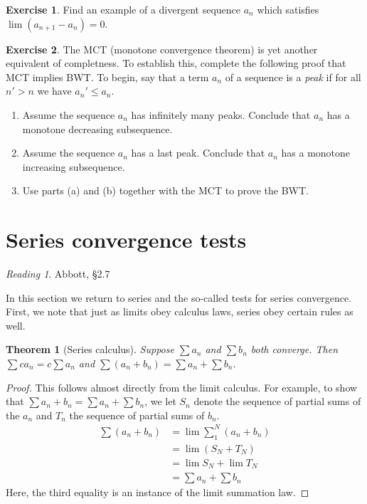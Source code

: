 \documentclass[11pt,oneside]{amsbook}
\theoremstyle{definition}
\newtheorem{exerc}{Exercise}[section]
\theoremstyle{plain}
\newtheorem{theorem}{Theorem}[section]
\theoremstyle{definition}
\theoremstyle{remark}
\newtheorem*{reading}{Reading}
\numberwithin{equation}{section}
\numberwithin{figure}{section}
\begin{document}
\begin{exerc}
  Find an example of a divergent sequence $a_n$ which satisfies $\lim(a_{n+1}-a_n)=0$.
\end{exerc}

\begin{exerc}
  The MCT (monotone convergence theorem) is yet another equivalent of completness. To establish this, complete the following proof that MCT implies BWT. To begin, say that a term $a_n$ of a sequence is a \emph{peak} if for all $n'>n$ we have $a_n'\leq a_n$.
  \begin{enumerate}
    \item Assume the sequence $a_n$ has infinitely many peaks. Conclude that $a_n$ has a monotone decreasing subsequence.
    \item Assume the sequence $a_n$ has a last peak. Conclude that $a_n$ has a monotone increasing subsequence.
    \item Use parts (a) and (b) together with the MCT to prove the BWT.
  \end{enumerate}
\end{exerc}

\newpage
\section{Series convergence tests}

\begin{reading}
  Abbott, \S 2.7
\end{reading}

In this section we return to series and the so-called tests for series convergence. First, we note that just as limits obey calculus laws, series obey certain rules as well.

\begin{theorem}[Series calculus]
  Suppose $\sum a_n$ and $\sum b_n$ both converge. Then $\sum ca_n=c\sum a_n$ and $\sum(a_n+b_n)=\sum a_n+\sum b_n$.
\end{theorem}

\begin{proof}
  This follows almost directly from the limit calculus. For example, to show that $\sum a_n+b_n=\sum a_n+\sum b_n$, we let $S_n$ denote the sequence of partial sums of the $a_n$ and $T_n$ the sequence of partial sums of $b_n$.
  \begin{align*}
    \sum(a_n+b_n)&=\lim\sum_1^N(a_n+b_n)\\
                &=\lim (S_N+T_N)\\
                &=\lim S_N+\lim T_N\\
                &=\sum a_n+\sum b_n
  \end{align*}
  Here, the third equality is an instance of the limit summation law.
\end{proof}
\end{document}
